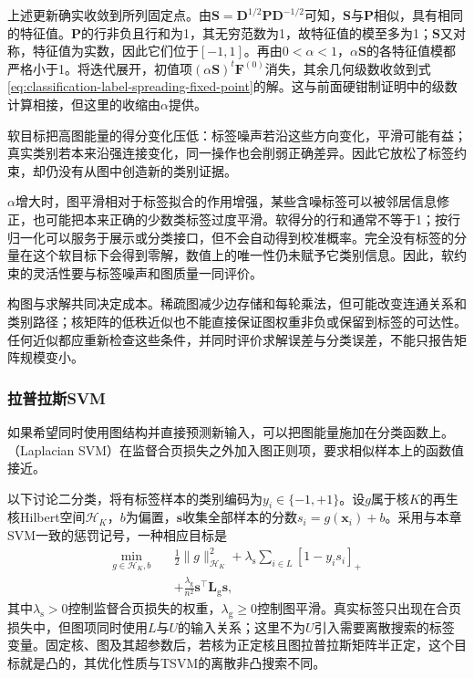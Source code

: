 上述更新确实收敛到所列固定点。由$\bm S=\bm D^{1/2}\bm P\bm D^{-1/2}$可知，$\bm S$与$\bm P$相似，具有相同的特征值。$\bm P$的行非负且行和为1，其无穷范数为1，故特征值的模至多为1；$\bm S$又对称，特征值为实数，因此它们位于$[-1,1]$。再由$0<\alpha<1$，$\alpha\bm S$的各特征值模都严格小于1。将迭代展开，初值项$(\alpha\bm S)^t\bm F^{(0)}$消失，其余几何级数收敛到式\eqref{eq:classification-label-spreading-fixed-point}的解。这与前面硬钳制证明中的级数计算相接，但这里的收缩由$\alpha$提供。

软目标把高图能量的得分变化压低：标签噪声若沿这些方向变化，平滑可能有益；真实类别若本来沿强连接变化，同一操作也会削弱正确差异。因此它放松了标签约束，却仍没有从图中创造新的类别证据。

$\alpha$增大时，图平滑相对于标签拟合的作用增强，某些含噪标签可以被邻居信息修正，也可能把本来正确的少数类标签过度平滑。软得分的行和通常不等于1；按行归一化可以服务于展示或分类接口，但不会自动得到校准概率。完全没有标签的分量在这个软目标下会得到零解，数值上的唯一性仍未赋予它类别信息。因此，软约束的灵活性要与标签噪声和图质量一同评价。

构图与求解共同决定成本。稀疏图减少边存储和每轮乘法，但可能改变连通关系和类别路径；核矩阵的低秩近似也不能直接保证图权重非负或保留到标签的可达性。任何近似都应重新检查这些条件，并同时评价求解误差与分类误差，不能只报告矩阵规模变小。

\subsubsection{拉普拉斯SVM}

如果希望同时使用图结构并直接预测新输入，可以把图能量施加在分类函数上。（Laplacian SVM）在监督合页损失之外加入图正则项，要求相似样本上的函数值接近。

以下讨论二分类，将有标签样本的类别编码为$y_i\in\{-1,+1\}$。设$g$属于核$K$的再生核Hilbert空间$\mathcal{H}_K$，$b$为偏置，$\bm{s}$收集全部样本的分数$s_i=g(\bm{x}_i)+b$。采用与本章SVM一致的惩罚记号，一种相应目标是
\begin{equation}
  \label{eq:classification-laplacian-svm}
  \begin{aligned}
    \min_{g\in\mathcal{H}_K,b}\quad
      &\frac12\lVert g\rVert_{\mathcal{H}_K}^2
       +\lambda_{\mathrm{s}}\sum_{i\in L}[1-y_i s_i]_+\\
      &+\frac{\lambda_{\mathrm{g}}}{n^2}
        \bm{s}^{\top}\bm{L}_{\mathrm{g}}\bm{s},
  \end{aligned}
\end{equation}
其中$\lambda_{\mathrm{s}}>0$控制监督合页损失的权重，$\lambda_{\mathrm{g}}\geq0$控制图平滑。真实标签只出现在合页损失中，但图项同时使用$L$与$U$的输入关系；这里不为$U$引入需要离散搜索的标签变量。固定核、图及其超参数后，若核为正定核且图拉普拉斯矩阵半正定，这个目标就是凸的，其优化性质与TSVM的离散非凸搜索不同。

